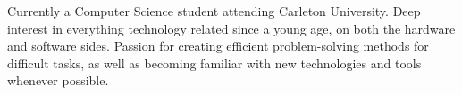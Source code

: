 

\begin{cvparagraph}

Currently a Computer Science student attending Carleton University. Deep interest in everything technology related since a young age, on both the hardware and software sides. Passion for creating efficient problem-solving methods for difficult tasks, as well as becoming familiar with new technologies and tools whenever possible.  
\end{cvparagraph}
